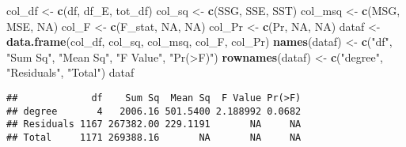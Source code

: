 \documentclass[]{article}
\newenvironment{Shaded}{\begin{snugshade}}{\end{snugshade}}
\newcommand{\KeywordTok}[1]{\textcolor[rgb]{0.13,0.29,0.53}{\textbf{#1}}}
\newcommand{\StringTok}[1]{\textcolor[rgb]{0.31,0.60,0.02}{#1}}
\newcommand{\OtherTok}[1]{\textcolor[rgb]{0.56,0.35,0.01}{#1}}
\newcommand{\NormalTok}[1]{#1}
\begin{document}
\begin{Shaded}
\begin{Highlighting}[]
\NormalTok{col_df <-}\StringTok{ }\KeywordTok{c}\NormalTok{(df, df_E, tot_df)}
\NormalTok{col_sq <-}\StringTok{ }\KeywordTok{c}\NormalTok{(SSG, SSE, SST)}
\NormalTok{col_msq <-}\StringTok{ }\KeywordTok{c}\NormalTok{(MSG, MSE, }\OtherTok{NA}\NormalTok{)}
\NormalTok{col_F <-}\StringTok{ }\KeywordTok{c}\NormalTok{(F_stat, }\OtherTok{NA}\NormalTok{, }\OtherTok{NA}\NormalTok{)}
\NormalTok{col_Pr <-}\StringTok{ }\KeywordTok{c}\NormalTok{(Pr, }\OtherTok{NA}\NormalTok{, }\OtherTok{NA}\NormalTok{)}
\NormalTok{dataf <-}\StringTok{ }\KeywordTok{data.frame}\NormalTok{(col_df, col_sq, col_msq, col_F, col_Pr)}
\KeywordTok{names}\NormalTok{(dataf) <-}\StringTok{ }\KeywordTok{c}\NormalTok{(}\StringTok{"df"}\NormalTok{, }\StringTok{"Sum Sq"}\NormalTok{, }\StringTok{"Mean Sq"}\NormalTok{, }\StringTok{"F Value"}\NormalTok{, }\StringTok{"Pr(>F)"}\NormalTok{)}
\KeywordTok{rownames}\NormalTok{(dataf) <-}\StringTok{ }\KeywordTok{c}\NormalTok{(}\StringTok{"degree"}\NormalTok{, }\StringTok{"Residuals"}\NormalTok{, }\StringTok{"Total"}\NormalTok{)}
\NormalTok{dataf}
\end{Highlighting}
\end{Shaded}

\begin{verbatim}
##             df    Sum Sq  Mean Sq  F Value Pr(>F)
## degree       4   2006.16 501.5400 2.188992 0.0682
## Residuals 1167 267382.00 229.1191       NA     NA
## Total     1171 269388.16       NA       NA     NA
\end{verbatim}
\end{document}
